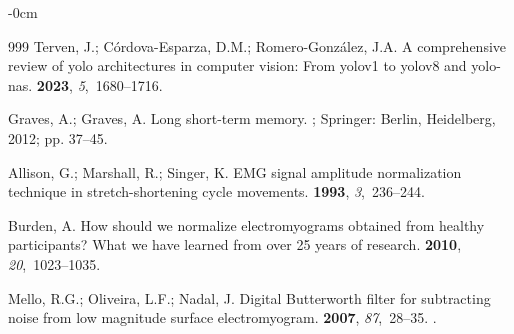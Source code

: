 \documentclass[actuators,article,accept,pdftex,moreauthors]{Definitions/mdpi}
\begin{document}
\begin{adjustwidth}{-\extralength}{0cm}
\begin{thebibliography}{999}
Terven, J.; C{\'o}rdova-Esparza, D.M.; Romero-Gonz{\'a}lez, J.A.
\newblock A comprehensive review of yolo architectures in computer vision: From
  yolov1 to yolov8 and yolo-nas.
 {\bf 2023}, {\em
  5},~1680--1716.

Graves, A.; Graves, A.
\newblock Long short-term memory.
; Springer: Berlin, Heidelberg, {2012;} %
 pp. 37--45.

Allison, G.; Marshall, R.; Singer, K.
\newblock EMG signal amplitude normalization technique in stretch-shortening
  cycle movements.
 {\bf 1993}, {\em
  3},~236--244.

Burden, A.
\newblock How should we normalize electromyograms obtained from healthy
  participants? What we have learned from over 25 years of research.
 {\bf 2010}, {\em
  20},~1023--1035.

Mello, R.G.; Oliveira, L.F.; Nadal, J.
\newblock Digital Butterworth filter for subtracting noise from low magnitude
  surface electromyogram.
 {\bf 2007}, {\em
  87},~28--35.
.

\end{thebibliography}





\end{adjustwidth}
\end{document}
